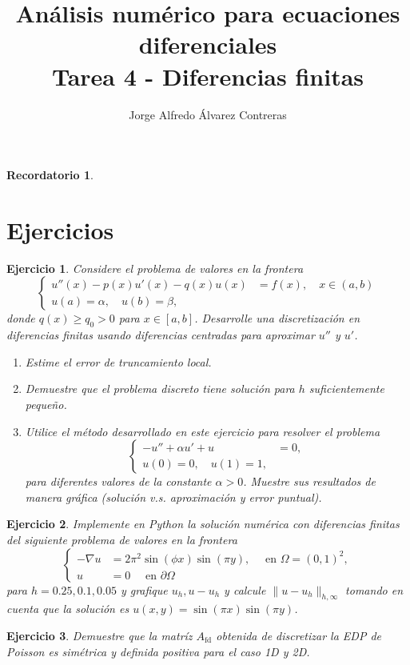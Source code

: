 \documentclass[11pt]{article}
\title{Análisis numérico para ecuaciones diferenciales \\
Tarea 4 - Diferencias finitas}
\author{Jorge Alfredo Álvarez Contreras}
\newtheorem{reminder}{Recordatorio}
\newtheorem{exercise}{Ejercicio}
\newcommand\fd{\mathrm{fd}}
\begin{document}
\maketitle

\begin{reminder}
\end{reminder}

\section*{Ejercicios}

\begin{exercise}
  Considere el problema de valores en la frontera
  \begin{equation}
    \left\{
      \begin{aligned}
        u''(x) - p(x)u'(x) - q(x)u(x) &= f(x), \quad x\in(a,b)
        \\
        u(a) = \alpha, \quad u(b)=\beta, &
      \end{aligned}
    \right.
  \end{equation}
  donde $q(x)\geq q_0>0$ para $x\in[a,b]$. Desarrolle una
  discretización en diferencias finitas usando diferencias centradas
  para aproximar $u''$ y $u'$.
  \begin{enumerate}
    \item
      Estime el error de truncamiento local.
    \item
      Demuestre que el problema discreto tiene solución para $h$ 
      suficientemente pequeño.
    \item
      Utilice el método desarrollado en este ejercicio para resolver
      el problema
      \begin{equation}
        \left\{
          \begin{aligned}
            -u'' + \alpha u' + u &= 0,
            \\
            u(0) = 0,\quad u(1)=1,
          \end{aligned}
        \right.
      \end{equation}
      para diferentes valores de la constante $\alpha>0$. Muestre sus
      resultados de manera gráfica (solución v.s. aproximación y error
      puntual).
  \end{enumerate}
\end{exercise}

\begin{exercise}
  Implemente en Python la solución numérica con diferencias finitas
  del siguiente problema de valores en la frontera
  \begin{equation}
    \left\{
      \begin{aligned}
        -\nabla u &= 2\pi^{2}\sin(\phi x)\sin(\pi y),
        \quad \text{ en } \Omega = (0,1) ^{2},
        \\
        u &= 0 
        \quad \text{ en } \partial\Omega
      \end{aligned}
    \right.
  \end{equation}
  para $h=0.25,0.1,0.05$ y grafique $u_h,u-u_h$ y calcule
  $\|u-u_h\|_{h,\infty}$ tomando en cuenta que la solución es
  $u(x,y)=\sin(\pi x)\sin(\pi y)$.
\end{exercise}

\begin{exercise}
  Demuestre que la matríz $A_{\fd}$ obtenida de discretizar la EDP de
  Poisson es simétrica y definida positiva para el caso 1D y 2D.
\end{exercise}
\end{document}
